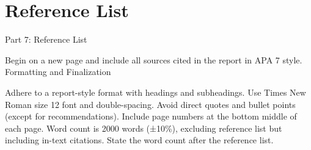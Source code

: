 \documentclass{article}
\begin{document}
\section{Reference List}
Part 7: Reference List

Begin on a new page and include all sources cited in the report in APA 7 style.
Formatting and Finalization

Adhere to a report-style format with headings and subheadings.
Use Times New Roman size 12 font and double-spacing.
Avoid direct quotes and bullet points (except for recommendations).
Include page numbers at the bottom middle of each page.
Word count is 2000 words (±10\%), excluding reference list but including in-text citations.
State the word count after the reference list.
\end{document}
